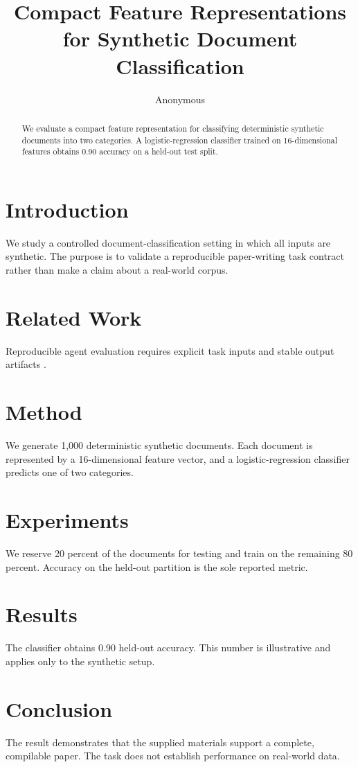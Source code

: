 \documentclass{article}
\title{Compact Feature Representations for Synthetic Document Classification}
\author{Anonymous}
\date{}
\begin{document}
\maketitle

\begin{abstract}
We evaluate a compact feature representation for classifying deterministic synthetic documents into two categories. A logistic-regression classifier trained on 16-dimensional features obtains 0.90 accuracy on a held-out test split.
\end{abstract}

\section{Introduction}
We study a controlled document-classification setting in which all inputs are synthetic. The purpose is to validate a reproducible paper-writing task contract rather than make a claim about a real-world corpus.

\section{Related Work}
Reproducible agent evaluation requires explicit task inputs and stable output artifacts \cite{harbor2024}.

\section{Method}
We generate 1,000 deterministic synthetic documents. Each document is represented by a 16-dimensional feature vector, and a logistic-regression classifier predicts one of two categories.

\section{Experiments}
We reserve 20 percent of the documents for testing and train on the remaining 80 percent. Accuracy on the held-out partition is the sole reported metric.

\section{Results}
The classifier obtains 0.90 held-out accuracy. This number is illustrative and applies only to the synthetic setup.

\section{Conclusion}
The result demonstrates that the supplied materials support a complete, compilable paper. The task does not establish performance on real-world data.



\end{document}
